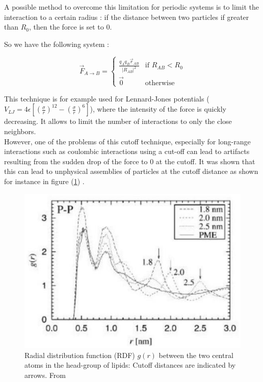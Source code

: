 \documentclass[11pt,twoside,a4paper]{report}
\begin{document}
A possible method to overcome this limitation for periodic systems is to limit the interaction to a certain radius : if the distance between two particles if greater than $R_0$, then the force is set to $0$.

So we have the following system :


\begin{equation}
  \overrightarrow{F}_{A \rightarrow B}  =
	\begin{cases}
	  \frac{q_A q_B \vec{r}_{AB} }{|R_{AB}|^2}  & \text{if } R_{AB} < R_0 \\
	  \overrightarrow{0} & \text{otherwise}
	\end{cases}
\end{equation}

This technique is for example used for Lennard-Jones potentials ($V_{LJ} = 4\epsilon [(\frac{\sigma}{r})^12 - (\frac{\sigma}{r})^6] $), where the intensity of the force is quickly decreasing. It allows to limit the number of interactions to only the close neighbors.\\

However, one of the problems of this cutoff technique, especially for long-range interactions such as coulombic interactions using a cut-off can lead to artifacts resulting from the sudden drop of the force to 0 at the cutoff. It was shown that this can lead to unphysical assemblies of particles at the cutoff distance as shown for instance in figure (\ref{fig:artefact}) .

\begin{figure}[H]

\includegraphics[scale=0.8]{artefact}
 \centering
 
\caption{Radial distribution function (RDF) $g(r)$ between the two
central atoms in the head-group of lipids: Cutoff distances are indicated by arrows. From \cite{patra2003molecular}  }

\label{fig:artefact}

\end{figure}
\end{document}
